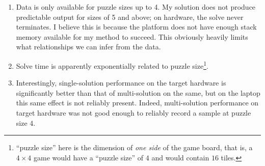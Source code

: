 \documentclass[11pt]{article}
\begin{document}
\begin{enumerate}
  \item Data is only available for puzzle sizes up to 4.
    My solution does not produce predictable output for sizes of 5 and above; on hardware, the solve never terminates.
    I believe this is because the platform does not have enough stack memory available for my method to succeed.
    This obviously heavily limits what relationships we can infer from the data.
  \item Solve time is apparently exponentially related to puzzle size\footnote{``puzzle size'' here is the dimension of \textit{one side} of the game board, that is, a $4 \times 4$ game would have a ``puzzle size'' of $4$ and would contain $16$ tiles.}.
  \item Interestingly, single-solution performance on the target hardware is significantly better than that of multi-solution on the same, but on the laptop this same effect is not reliably present.
    Indeed, multi-solution performance on target hardware was not good enough to reliably record a sample at puzzle size 4.
\end{enumerate}

\end{document}
